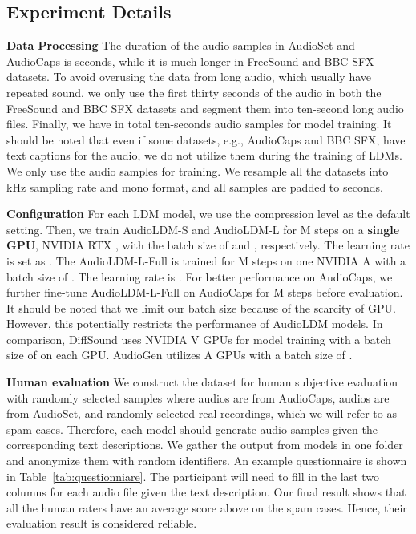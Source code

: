 \documentclass{article}
\begin{document}
\subsection{Experiment Details}
\label{app:TrainingDetails}

\textbf{Data Processing} The duration of the audio samples in AudioSet and AudioCaps is  seconds, while it is much longer in FreeSound and BBC SFX datasets. To avoid overusing the data from long audio, which usually have repeated sound, we only use the first thirty seconds of the audio in both the FreeSound and BBC SFX datasets and segment them into ten-second long audio files. Finally, we have in total  ten-seconds audio samples for model training. It should be noted that even if some datasets, e.g., AudioCaps and BBC SFX, have text captions for the audio, we do not utilize them during the training of LDMs. We only use the audio samples for training. We resample all the datasets into kHz sampling rate and mono format, and all samples are padded to  seconds. 

\textbf{Configuration} For each LDM model, we use the compression level  as the default setting. Then, we train AudioLDM-S and AudioLDM-L for M steps on a \textbf{single GPU}, NVIDIA RTX , with the batch size of  and , respectively. The learning rate is set as . The AudioLDM-L-Full is trained for M steps on one NVIDIA A with a batch size of . The learning rate is . For better performance on AudioCaps, we further fine-tune AudioLDM-L-Full on AudioCaps for M steps before evaluation. It should be noted that we limit our batch size because of the scarcity of GPU. However, this potentially restricts the performance of AudioLDM models. In comparison, DiffSound uses  NVIDIA V GPUs for model training with a batch size of  on each GPU. AudioGen utilizes  A GPUs with a batch size of . 

\textbf{Human evaluation} We construct the  dataset for human subjective evaluation with  randomly selected samples where  audios are from AudioCaps,  audios are from AudioSet, and  randomly selected real recordings, which we will refer to as spam cases. Therefore, each model should generate  audio samples given the corresponding text descriptions. We gather the output from models in one folder and anonymize them with random identifiers. An example questionnaire is shown in Table~\ref{tab:questionniare}. The participant will need to fill in the last two columns for each audio file given the text description. Our final result shows that all the human raters have an average score above  on the spam cases. Hence, their evaluation result is considered reliable.
\end{document}
